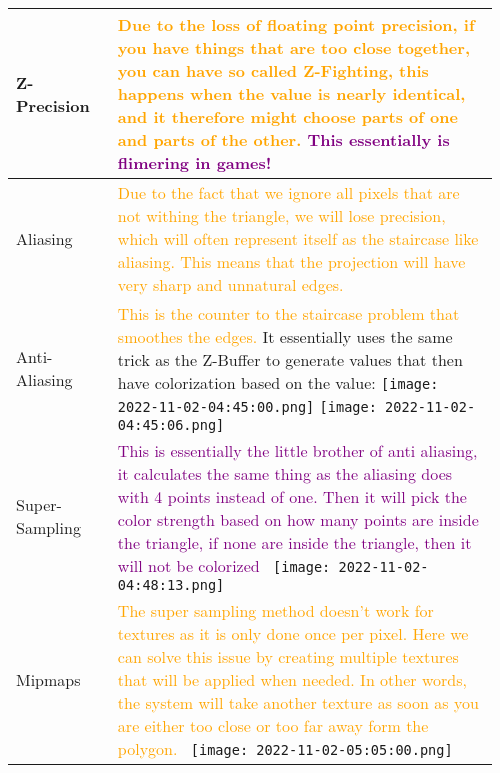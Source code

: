 \documentclass[main.tex,fontsize=8pt,paper=a4,paper=portrait,DIV=calc,]{scrartcl}
\begin{document}
\begin{table}[ht!]
\begin{tabular}{|m{0.2\linewidth}|m{0.755\linewidth}|}
\hline
Z-Precision & 
\textcolor{orange}{Due to the loss of floating point precision, if you have things that are too close together, you can have so called \textbf{Z-Fighting}, this happens when the value is nearly identical, and it therefore might choose parts of one and parts of the other.}\newline
\textcolor{purple}{This essentially is flimering in games!}\\
\hline
Aliasing & 
\textcolor{orange}{Due to the fact that we ignore all pixels that are not withing the triangle, we will lose precision, which will often represent itself as the staircase like aliasing. This means that the projection will have very sharp and unnatural edges.}\\
\hline
Anti-Aliasing & 
\textcolor{orange}{This is the counter to the staircase problem that smoothes the edges.}\newline
\textcolor{pruple}{It essentially uses the same trick as the Z-Buffer to generate values that then have colorization based on the value:}\newline
\texttt{[image: 2022-11-02-04:45:00.png]} \texttt{[image: 2022-11-02-04:45:06.png]}\\
\hline
Super-Sampling & 
\textcolor{purple}{This is essentially the little brother of anti aliasing, it calculates the same thing as the aliasing does with 4 points instead of one.\newline
Then it will pick the color strength based on how many points are inside the triangle, if none are inside the triangle, then it will not be colorized}\newline
\, \newline
\texttt{[image: 2022-11-02-04:48:13.png]}\\
\hline
Mipmaps & 
\textcolor{orange}{The super sampling method doesn't work for textures as it is only done once per pixel.\newline
Here we can solve this issue by creating multiple textures that will be applied when needed.\newline
In other words, the system will take another texture as soon as you are either too close or too far away form the polygon.}\newline
\, \newline
\texttt{[image: 2022-11-02-05:05:00.png]}\\
\hline
\end{tabular}

\end{table}
\end{document}
